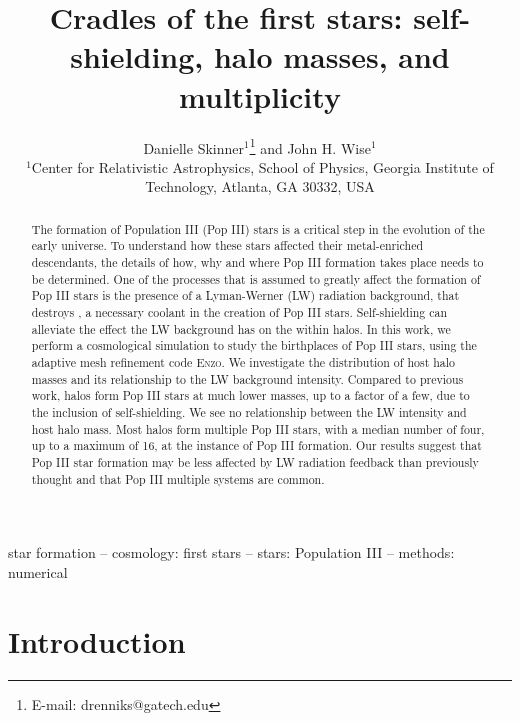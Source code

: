 \documentclass[fleqn,usenatbib]{mnras}
\title[Cradles of the first stars]{Cradles of the first stars: self-shielding, halo masses, and multiplicity}
\author[D. Skinner and J.~H. Wise]{
Danielle Skinner$^{1}$\thanks{E-mail: drenniks@gatech.edu}
and John H. Wise$^{1}$
\\
$^{1}$Center for Relativistic Astrophysics, School of Physics, Georgia Institute of Technology, Atlanta, GA 30332, USA\\
}
\begin{document}
\label{firstpage}
\pagerange{\pageref{firstpage}--\pageref{lastpage}}
\maketitle

\begin{abstract}
The formation of Population III (Pop III) stars is a critical step in the evolution of the early universe. To understand how these stars affected their metal-enriched descendants, the details of how, why and where Pop III formation takes place needs to be determined. One of the processes that is assumed to greatly affect the formation of Pop III stars is the presence of a Lyman-Werner (LW) radiation background, that destroys \hh{}, a necessary coolant in the creation of Pop III stars. Self-shielding can alleviate the effect the LW background has on the \hh{} within halos. In this work, we perform a cosmological simulation to study the birthplaces of Pop III stars, using the adaptive mesh refinement code \textsc{Enzo}. We investigate the distribution of host halo masses and its relationship to the LW background intensity. Compared to previous work, halos form Pop III stars at much lower masses, up to a factor of a few, due to the inclusion of \hh{} self-shielding. We see no relationship between the LW intensity and host halo mass. Most halos form multiple Pop III stars, with a median number of four, up to a maximum of 16, at the instance of Pop III formation. Our results suggest that Pop III star formation may be less affected by LW radiation feedback than previously thought and that Pop III multiple systems are common. 
\end{abstract}{}

\begin{keywords}
star formation  -- cosmology: first stars -- stars: Population III -- methods: numerical
\end{keywords}


\section{Introduction}
\end{document}
